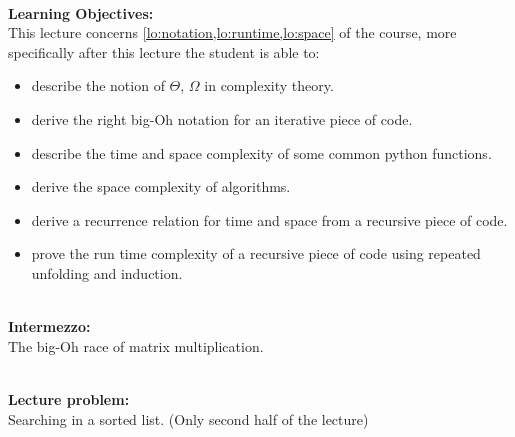 \hfill\\
\textbf{Learning Objectives:}\\
This lecture concerns \cref{lo:notation,lo:runtime,lo:space} of the course, more specifically after this lecture the
student is able to:
\begin{itemize}
	\item describe the notion of $\Theta$, $\Omega$ in complexity theory.
	\item derive the right big-Oh notation for an iterative piece of code.
	\item describe the time and space complexity of some common python functions.
	\item derive the space complexity of algorithms.
	\item derive a recurrence relation for time and space from a recursive piece of code.
	\item prove the run time complexity of a recursive piece of code using repeated unfolding and induction.
\end{itemize}

\hfill\\
\textbf{Intermezzo:}\\
The big-Oh race of matrix multiplication.

\hfill\\
\textbf{Lecture problem:}\\
Searching in a sorted list. (Only second half of the lecture)

